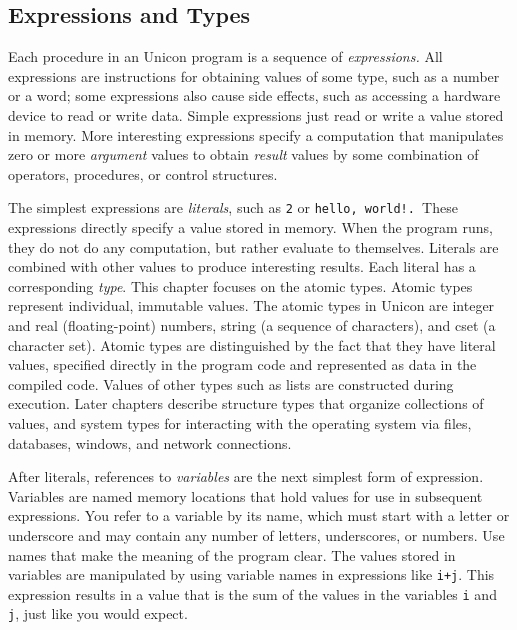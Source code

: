 \subsection{Expressions and Types}

Each procedure in an Unicon program is a sequence of
\textit{expression}\textit{s.} All expressions are
instructions for obtaining values of some
type, such as a number or a word; some expressions also
cause side effects, such as accessing a hardware device to read or
write data. Simple expressions just read or write a value stored in
memory. More interesting expressions specify a computation that
manipulates zero or more \textit{argument} values to
obtain \textit{result} values by some combination of
operators, procedures, or control structures.

The simplest expressions are \textit{literal}\textit{s},
such as \texttt{2} or \texttt{{\textquotedbl}hello,
world!{\textquotedbl}}\texttt{. }These expressions directly specify a
value stored in memory. When the program runs, they do not do any
computation, but rather evaluate to themselves. Literals are combined
with other values to produce interesting results. Each literal has a
corresponding \textit{type}. This chapter focuses on the atomic types. Atomic types represent individual, immutable values. The atomic types in Unicon are
integer and real (floating-point)
numbers, string (a sequence of characters), and
cset (a character set). Atomic types
are distinguished by the fact that they have literal values, specified
directly in the program code and represented as data in the compiled
code. Values of other types such as lists are constructed during
execution. Later chapters describe structure types that organize
collections of values, and system types for interacting with the
operating system via files, databases, windows, and network
connections. 

After literals, references to
\textit{variable}\textit{s} are the next simplest form
of expression. Variables are named memory locations that hold values
for use in subsequent expressions. You refer to a variable by its name,
which must start with a letter or underscore and may contain any number
of letters, underscores, or numbers. Use names that make the meaning of
the program clear. The values stored in variables are manipulated by
using variable names in expressions like \texttt{i+j}. This expression
results in a value that is the sum of the values in the variables
\texttt{i} and \texttt{j}, just like you would expect.

